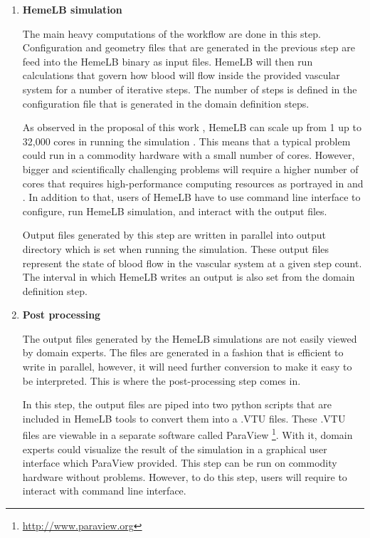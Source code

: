 \begin{enumerate}
\item{\textbf{HemeLB simulation}}

The main heavy computations of the workflow are done in this step.  Configuration and geometry files that are generated in the previous step are feed into the HemeLB binary as input files. HemeLB will then run calculations that govern how blood will flow inside the provided vascular system for a number of iterative steps. The number of steps is defined in the configuration file that is generated in the domain definition steps. 

As observed in the proposal of this work \citep{Steven:2016aa}, HemeLB can scale up from 1 up to 32,000 cores in running the simulation \citep{groen2013analysing}. This means that a typical problem could run in a commodity hardware with a small number of cores. However, bigger and scientifically challenging problems will require a higher number of cores that requires high-performance computing resources as portrayed in \cite{franco2016non, franco2015dynamic} and \cite{bernabeu2015characterization}. In addition to that, users of HemeLB have to use command line interface to configure, run HemeLB simulation, and interact with the output files. 

Output files generated by this step are written in parallel into output directory which is set when running the simulation. These output files represent the state of blood flow in the vascular system at a given step count. The interval in which HemeLB writes an output is also set from the domain definition step.

\item{\textbf{Post processing}}

The output files generated by the HemeLB simulations are not easily viewed by domain experts. The files are generated in a fashion that is efficient to write in parallel, however, it will need further conversion to make it easy to be interpreted. This is where the post-processing step comes in.  

In this step, the output files are piped into two python scripts that are included in HemeLB tools to convert them into a .VTU files. These .VTU files are viewable in a separate software called ParaView \footnote{\url{http://www.paraview.org}}. With it, domain experts could visualize the result of the simulation in a graphical user interface which ParaView provided. This step can be run on commodity hardware without problems. However, to do this step, users will require to interact with command line interface.

\end{enumerate}

